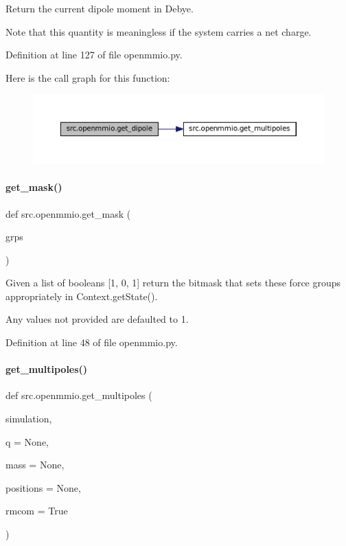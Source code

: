 Return the current dipole moment in Debye. 

Note that this quantity is meaningless if the system carries a net charge. 

Definition at line 127 of file openmmio.\+py.

Here is the call graph for this function\+:
\nopagebreak
\begin{figure}[H]
\begin{center}
\leavevmode
\includegraphics[width=350pt]{namespacesrc_1_1openmmio_a8b766c129297cc81c86b244f7bc56dac_cgraph}
\end{center}
\end{figure}
\mbox{\label{namespacesrc_1_1openmmio_ad7583e022fa36c353cef6481931550bb}} 
\paragraph{\texorpdfstring{get\+\_\+mask()}{get\_mask()}}
{\footnotesize\ttfamily def src.\+openmmio.\+get\+\_\+mask (\begin{DoxyParamCaption}\item[{}]{grps }\end{DoxyParamCaption})}



Given a list of booleans \mbox{[}1, 0, 1\mbox{]} return the bitmask that sets these force groups appropriately in Context.\+get\+State(). 

Any values not provided are defaulted to 1. 

Definition at line 48 of file openmmio.\+py.

\mbox{\label{namespacesrc_1_1openmmio_ad38addc4a72dedef5717b71f4680c02f}} 
\paragraph{\texorpdfstring{get\+\_\+multipoles()}{get\_multipoles()}}
{\footnotesize\ttfamily def src.\+openmmio.\+get\+\_\+multipoles (\begin{DoxyParamCaption}\item[{}]{simulation,  }\item[{}]{q = {\ttfamily None},  }\item[{}]{mass = {\ttfamily None},  }\item[{}]{positions = {\ttfamily None},  }\item[{}]{rmcom = {\ttfamily True} }\end{DoxyParamCaption})}



